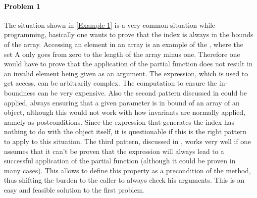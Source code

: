\paragraph{Problem 1}
The situation shown in \ref{Example 1} is a very common situation while programming, basically one wants to prove that the index is always in the bounds of the array. Accessing an element in an array is an example of the , where the set A only goes from zero to the length of the array minus one. Therefore one would have to prove that the application of the partial function does not result in an invalid element being given as an argument. The expression, which is used to get access, can be arbitrarily complex. The computation to ensure the in-boundness can be very expensive.  \newline
Also the second pattern discussed in  could be applied, always ensuring that a given parameter is in bound of an array of an object, although this would not work with how invariants are normally applied, namely as postconditions. Since the expression that generates the index has nothing to do with the object itself, it is questionable if this is the right pattern to apply to this situation. \newline
The third pattern, discussed in , works very well if one assumes that it can't be proven that the expression will always lead to a successful application of the partial function (although it could be proven in many cases). This allows to define this property as a precondition of the method, thus shifting the burden to the caller to always check his arguments. This is an easy and feasible solution to the first problem. 

